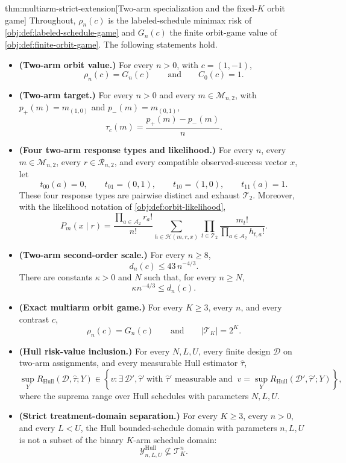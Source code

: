 \begin{theoremv}{thm:multiarm-strict-extension}[Two-arm specialization and the fixed-$K$ orbit game]
Throughout, \(\rho_n(c)\) is the labeled-schedule minimax risk of \cref{obj:def:labeled-schedule-game} and \(G_n(c)\) the finite orbit-game value of \cref{obj:def:finite-orbit-game}.
The following statements hold.
\begin{itemize}
\item \textbf{(Two-arm orbit value.)} For every \(n>0\), with \(c=(1,-1)\),
\[
\rho_n(c)=G_n(c)
\qquad\text{and}\qquad
C_0(c)=1 .
\]
\item \textbf{(Two-arm target.)} For every \(n>0\) and every \(m\in\mathcal M_{n,2}\), with \(p_+(m)=m_{(1,0)}\) and \(p_-(m)=m_{(0,1)}\),
\[
\tau_c(m)=\frac{p_+(m)-p_-(m)}{n}.
\]
\item \textbf{(Four two-arm response types and likelihood.)} For every \(n\), every \(m\in\mathcal M_{n,2}\), every \(r\in\mathcal R_{n,2}\), and every compatible observed-success vector \(x\), let
\[
t_{00}(a)=0,\qquad
t_{01}= (0,1),\qquad
t_{10}= (1,0),\qquad
t_{11}(a)=1 .
\]
These four response types are pairwise distinct and exhaust \(\mathcal T_2\). Moreover, with the likelihood notation of \cref{obj:def:orbit-likelihood},
\[
P_m(x\mid r)
=
\frac{\prod_{a\in\mathcal A_2} r_a!}{n!}
\sum_{h\in\mathcal H(m,r,x)}
\prod_{t\in\mathcal T_2}
\frac{m_t!}{\prod_{a\in\mathcal A_2} h_{t,a}!}.
\]
\item \textbf{(Two-arm second-order scale.)} For every \(n\ge 8\),
\[
d_n(c)\le 43\, n^{-4/3}.
\]
There are constants \(\kappa>0\) and \(N\) such that, for every \(n\ge N\),
\[
\kappa n^{-4/3}\le d_n(c).
\]
\item \textbf{(Exact multiarm orbit game.)} For every \(K\ge 3\), every \(n\), and every contrast \(c\),
\[
\rho_n(c)=G_n(c)
\qquad\text{and}\qquad
|\mathcal T_K|=2^K .
\]
\item \textbf{(Hull risk-value inclusion.)} For every \(N,L,U\), every finite design \(\mathcal D\) on two-arm assignments, and every measurable Hull estimator \(\widehat\tau\),
\[
\sup_{Y} R_{\mathrm{Hull}}(\mathcal D,\widehat\tau;Y)
\in
\left\{
v:\exists\,\mathcal D',\widehat\tau'\ \text{with \(\widehat\tau'\) measurable and }\
v=\sup_Y R_{\mathrm{Hull}}(\mathcal D',\widehat\tau';Y)
\right\},
\]
where the suprema range over Hull schedules with parameters \(N,L,U\).
\item \textbf{(Strict treatment-domain separation.)} For every \(K\ge 3\), every \(n>0\), and every \(L<U\), the Hull bounded-schedule domain with parameters \(n,L,U\) is not a subset of the binary \(K\)-arm schedule domain:
\[
\mathcal Y^{\mathrm{Hull}}_{n,L,U}\nsubseteq \mathcal T_K^n .
\]
\end{itemize}
\end{theoremv}

